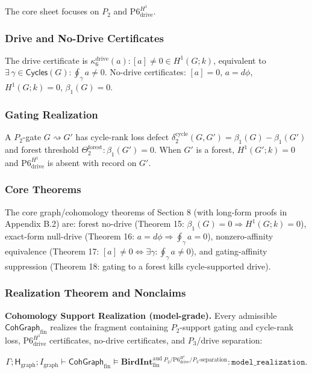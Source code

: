 \documentclass[11pt]{article}
\theoremstyle{definition}
\begin{document}
The core sheet focuses on \(P_{2}\) and \(\mathrm{P6}_{\mathrm{drive}}^{H^{1}}\).

\subsubsection{Drive and No-Drive Certificates}

The drive certificate is \(\kappa_{6}^{\mathrm{drive}}(a):[a]\neq 0\in H^{1}(G;k)\), equivalent to \(\exists\,\gamma\in\mathsf{Cycles}(G):\oint_{\gamma}a\neq 0\). No-drive certificates: \([a]=0\), \(a=d\phi\), \(H^{1}(G;k)=0\), \(\beta_{1}(G)=0\).

\subsubsection{Gating Realization}

A \(P_{2}\)-gate \(G\rightsquigarrow G'\) has cycle-rank loss defect \(\delta_{2}^{\mathrm{cycle}}(G,G')=\beta_{1}(G)-\beta_{1}(G')\) and forest threshold \(\Theta_{2}^{\mathrm{forest}}:\beta_{1}(G')=0\). When \(G'\) is a forest, \(H^{1}(G';k)=0\) and \(\mathrm{P6}_{\mathrm{drive}}^{H^{1}}\) is absent with record on \(G'\).

\subsubsection{Core Theorems}

The core graph/cohomology theorems of Section 8 (with long-form proofs in Appendix B.2) are: forest no-drive (Theorem 15: \(\beta_{1}(G)=0\Rightarrow H^{1}(G;k)=0\)), exact-form null-drive (Theorem 16: \(a=d\phi\Rightarrow\oint_{\gamma}a=0\)), nonzero-affinity equivalence (Theorem 17: \([a]\neq 0\iff\exists\gamma:\oint_{\gamma}a\neq 0\)), and gating-affinity suppression (Theorem 18: gating to a forest kills cycle-supported drive).

\subsubsection{Realization Theorem and Nonclaims}

\textbf{Cohomology Support Realization (model-grade).} Every admissible \(\mathsf{CohGraph}_{\mathrm{fin}}\) realizes the fragment containing \(P_{2}\)-support gating and cycle-rank loss, \(\mathrm{P6}_{\mathrm{drive}}^{H^{1}}\) certificates, no-drive certificates, and \(P_{3}\)/drive separation:

\[
\Gamma;\mathsf H_{\mathrm{graph}};I_{\mathrm{graph}}\vdash\mathsf{CohGraph}_{\mathrm{fin}}\models\mathbf{BirdInt}^{\mathrm{aud}}_{\mathrm{fin}}{}^{\,P_{2}/\mathrm{P6}_{\mathrm{drive}}^{H^{1}}/P_{3}\text{-separation}}:\texttt{model\_realization}.
\]
\end{document}
